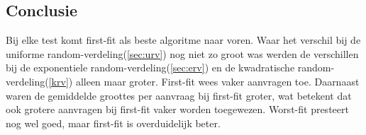 \documentclass[a4paper]{article}
\begin{document}
\newpage

	\subsection{Conclusie}
	Bij elke test komt first-fit als beste algoritme naar voren. Waar het verschil bij de uniforme random-verdeling(\ref{sec:urv}) nog niet zo groot was werden de verschillen bij de exponentiele random-verdeling(\ref{sec:erv}) en de kwadratische random-verdeling(\ref{krv}) alleen maar groter. First-fit wees vaker aanvragen toe. Daarnaast waren de gemiddelde groottes per aanvraag bij first-fit groter, wat betekent dat ook grotere aanvragen bij first-fit vaker worden toegewezen. Worst-fit presteert nog wel goed, maar first-fit is overduidelijk beter.
\end{document}
